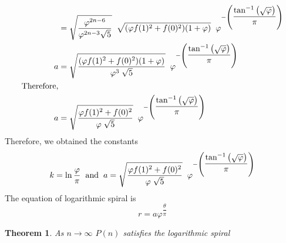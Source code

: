 \documentclass[preprint,12pt]{elsarticle}
\newtheorem{theorem}{Theorem}[section]
\begin{document}
	\begin{align*}
	&= \sqrt{\dfrac{\varphi^{2n-6}}{\varphi^{2n-3}\sqrt{5}}}\hspace{2mm}\sqrt{(\varphi f(1)^2 + f(0)^2)(1+\varphi)}\hspace{2mm}\varphi^{-\left(\dfrac{ \tan^{-1}{\left(\sqrt{\varphi}\right)}}{\pi}\right)}\\
	a &= \sqrt{\dfrac{(\varphi f(1)^2 + f(0)^2)(1+\varphi)}{\varphi^3\hspace{1mm}\sqrt{5}}}\hspace{2mm}\varphi^{-\left(\dfrac{ \tan^{-1}{\left(\sqrt{\varphi}\right)}}{\pi}\right)}\\
	\text{Therefore,}\\
	a &= \sqrt{\dfrac{\varphi f(1)^2 + f(0)^2}{\varphi\hspace{1mm}\sqrt{5}}}\hspace{2mm}\varphi^{-\left(\dfrac{ \tan^{-1}{\left(\sqrt{\varphi}\right)}}{\pi}\right)}
	\end{align*}
	Therefore, we obtained the constants $$k = \ln{\dfrac{\varphi}{\pi}} \hspace{2mm}\text{and}\hspace{2mm}a=\sqrt{\dfrac{\varphi f(1)^2 + f(0)^2}{\varphi\hspace{1mm}\sqrt{5}}}\hspace{2mm}\varphi^{-\left(\dfrac{ \tan^{-1}{\left(\sqrt{\varphi}\right)}}{\pi}\right)}$$
	The equation of logarithmic spiral is $$r = a\varphi^{\dfrac{\theta}{\pi}}$$
	\begin{theorem}
		As $n \to \infty$ $P(n)$ satisfies the logarithmic spiral
	\end{theorem}
\end{document}
